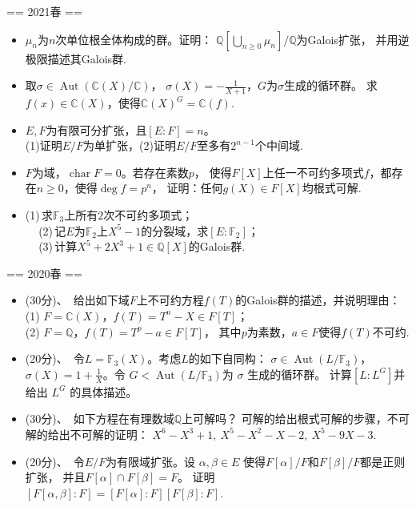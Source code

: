 == 2021春 ==

\begin{itemize}
\item[一、] $\mu_n$为$n$次单位根全体构成的群。证明：
$\mathbb{Q}[\bigcup\limits_{n\geq 0}\mu_n]/\mathbb{Q}$为Galois扩张，
并用逆极限描述其Galois群.
\item[二、] 取$\sigma\in \operatorname{Aut}(\mathbb{C}(X)/\mathbb{C})$，
$\sigma(X)=-\frac1{X+1}$，$G$为$\sigma$生成的循环群。
求$f(x)\in \mathbb{C}(X)$，使得$\mathbb{C}(X)^G=\mathbb{C}(f)$.
\item[三、] $E,F$为有限可分扩张，且$[E:F]=n$。\\
(1)证明$E/F$为单扩张，(2)证明$E/F$至多有$2^{n-1}$个中间域.
\item[四、] $F$为域，$\operatorname{char} F=0$。若存在素数$p$，
使得$F[X]$上任一不可约多项式$f$，都存在$n\geq0$，使得$\deg f=p^n$，
证明：任何$g(X)\in F[X]$均根式可解.
\item[五、] (1)\,求$\mathbb{F}_3$上所有$2$次不可约多项式；\\
\quad\ \ \,(2)\,记$E$为$\mathbb{F}_2$上$X^5-1$的分裂域，求$[E:\mathbb{F}_2]$；\\
\quad\ \ \,(3)\,计算$X^5+2X^3+1\in \mathbb{Q}[X]$的Galois群.
\end{itemize}

== 2020春 ==

\begin{itemize}
\item[一] (30分)、\ 给出如下域$F$上不可约方程$f(T)$的Galois群的描述，并说明理由：\\
(1) $F=\mathbb{C}(X)$，$f(T)=T^{n}-X \in F[T]$；\\
(2) $F=\mathbb{Q}$，$f(T)=T^p-a \in F[T]$，
其中$p$为素数，$a \in F$使得$f(T)$不可约.
\item[二] (20分)、\ 令$L=\mathbb{F}_{3}(X)$。考虑$L$的如下自同构：
$\sigma \in \operatorname{Aut}(L/\mathbb{F}_{3})$，
$\sigma(X)=1+\frac{1}{X}$。令
$G<\operatorname{Aut}(L/\mathbb{F}_{3})$为 $\sigma$ 生成的循环群。
计算$[L:L^{G}]$并给出 $L^{G}$ 的具体描述。
\item[三] (30分)、\ 如下方程在有理数域$\mathbb{Q}$上可解吗？
可解的给出根式可解的步骤，不可解的给出不可解的证明：
$X^{6}-X^{3}+1,\ X^{5}-X^{2}-X-2,\ X^{5}-9X-3$.
\item[四] (20分)、\ 令$E/F$为有限域扩张。设 $\alpha,\beta \in E$
使得$F[\alpha]/F$和$F[\beta]/F$都是正则扩张，
并且$F[\alpha] \cap F[\beta]=F$。
证明$[F[\alpha,\beta]:F]=[F[\alpha]:F][F[\beta]:F]$.
\end{itemize}